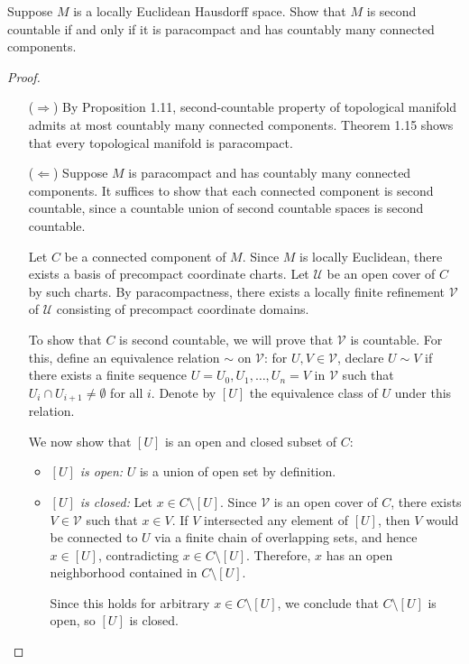 \begin{problem}
  Suppose $M$ is a locally Euclidean Hausdorff space. Show that $M$ is second
  countable if and only if it is paracompact and has countably many connected
  components. 
  \begin{proof}
    \begin{enumerate}
      \item[($\Rightarrow$)] 
      By Proposition 1.11, second-countable property of topological manifold admits at most countably many connected components. Theorem 1.15 shows that every topological manifold is paracompact.

      \item[($\Leftarrow$)] 
      Suppose $M$ is paracompact and has countably many connected components. It suffices to show that each connected component is second countable, since a countable union of second countable spaces is second countable.

      Let $C$ be a connected component of $M$. Since $M$ is locally Euclidean, there exists a basis of precompact coordinate charts. Let $\mathcal{U}$ be an open cover of $C$ by such charts. By paracompactness, there exists a locally finite refinement $\mathcal{V}$ of $\mathcal{U}$ consisting of precompact coordinate domains.

      To show that $C$ is second countable, we will prove that $\mathcal{V}$ is countable. For this, define an equivalence relation $\sim$ on $\mathcal{V}$: for $U, V \in \mathcal{V}$, declare $U \sim V$ if there exists a finite sequence $U = U_0, U_1, \dots, U_n = V$ in $\mathcal{V}$ such that $U_i \cap U_{i+1} \neq \emptyset$ for all $i$. Denote by $[U]$ the equivalence class of $U$ under this relation.

      We now show that $[U]$ is an open and closed subset of $C$:
      \begin{itemize}
        \item \emph{$[U]$ is open:} $U$ is a union of open set by definition.

        \item \emph{$[U]$ is closed:} Let $x \in C \setminus [U]$. Since $\mathcal{V}$ is an open cover of $C$, there exists $V \in \mathcal{V}$ such that $x \in V$. If $V$ intersected any element of $[U]$, then $V$ would be connected to $U$ via a finite chain of overlapping sets, and hence $x \in [U]$, contradicting $x \in C \setminus [U]$. Therefore, $x$ has an open neighborhood contained in $C \setminus [U]$.

        Since this holds for arbitrary $x \in C \setminus [U]$, we conclude that $C \setminus [U]$ is open, so $[U]$ is closed.
      \end{itemize}


\end{enumerate}
\end{proof}
\end{problem}
